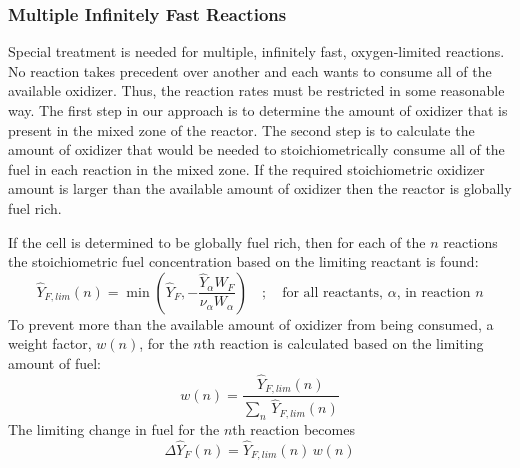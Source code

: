 \subsubsection{Multiple Infinitely Fast Reactions}   
Special treatment is needed for multiple, infinitely fast, oxygen-limited reactions. No reaction takes precedent over another and each wants to consume all of the available oxidizer.  Thus, the reaction rates must be restricted in some reasonable way. The first step in our approach is to determine the amount of oxidizer that is present in the mixed zone of the reactor. The second step is to calculate the amount of oxidizer that would be needed to stoichiometrically consume all of the fuel in each reaction in the mixed zone. If the required stoichiometric oxidizer amount is larger than the available amount of oxidizer then the reactor is globally fuel rich.

If the cell is determined to be globally fuel rich, then for each of the $n$ reactions the stoichiometric fuel concentration based on the limiting reactant is found:
\begin{equation}\label{eq:stoich_fuel}
\hat{Y}_{F,lim}(n) = \min \left (\hat{Y}_F,-\frac{\hat{Y}_{\alpha}W_{F}}{\nu_{\alpha} W_{\alpha}}\right) \quad ; \quad \mbox{for all reactants, $\alpha$, in reaction $n$}
\end{equation}
To prevent more than the available amount of oxidizer from being consumed, a weight factor, $w(n)$, for the $n$th reaction is calculated based on the limiting amount of fuel:
\begin{equation}\label{eq:fuel_weight}
w(n) = \frac{\hat{Y}_{F,lim}(n)}{\sum_n \, \hat{Y}_{F,lim}(n)}
\end{equation}
The limiting change in fuel for the $n$th reaction becomes
\begin{equation}\label{eq:fuel_rate}
\Delta \hat{Y}_{F}(n) = \hat{Y}_{F,lim}(n)\,w(n)
\end{equation}

